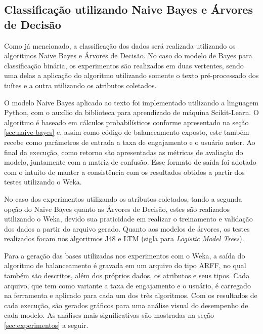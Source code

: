 \documentclass[oneside,openright,12pt]{ufsm_2015} %
\begin{document}

\subsection{Classificação utilizando Naive Bayes e Árvores de Decisão}
\label{sec:class-naive-tree}

    \par Como já mencionado, a classificação dos dados será realizada utilizando os algoritmos Naive Bayes e Árvores de Decisão. No caso do modelo de Bayes para classificação binária, os experimentos são realizados em duas vertentes, sendo uma delas a aplicação do algoritmo utilizando somente o texto pré-processado dos tuítes e a outra utilizando os atributos coletados.
    
    \par O modelo Naive Bayes aplicado ao texto foi implementado utilizando a linguagem Python, com o auxílio da biblioteca para aprendizado de máquina Scikit-Learn. O algoritmo é baseado em cálculos probabilísticos conforme apresentado na seção \ref{sec:naive-bayes} e, assim como código de balanceamento exposto, este também recebe como parâmetros de entrada a taxa de engajamento e o usuário autor. Ao final da execução, como retorno são apresentadas as métricas de avaliação do modelo, juntamente com a matriz de confusão. Esse formato de saída foi adotado com o intuito de manter a consistência com os resultados obtidos a partir dos testes utilizando o Weka.
    
    \par No caso dos experimentos utilizando os atributos coletados, tando a segunda opção do Naive Bayes quanto as Árvores de Decisão, estes são realizados utilizando o Weka, devido sua praticidade em realizar o treinamento e validação dos dados a partir do arquivo gerado. Quanto aos modelos de árvores, os testes realizados focam nos algoritmos J48 e LTM (sigla para \textit{Logistic Model Trees}).
    
    \par Para a geração das bases utilizadas nos experimentos com o Weka, a saída do algoritmo de balanceamento é gravada em um arquivo do tipo ARFF, no qual também são descritos, além dos próprios dados, os atributos e seus tipos. Cada arquivo, que tem como variante a taxa de engajamento e o usuário, é carregado na ferramenta e aplicado para cada um dos três algoritmos. Com os resultados de cada execução, são gerados gráficos para uma análise visual do desempenho de cada modelo. As análises mais significativas são mostradas na seção \ref{sec:experimentos} a seguir.
\end{document}
